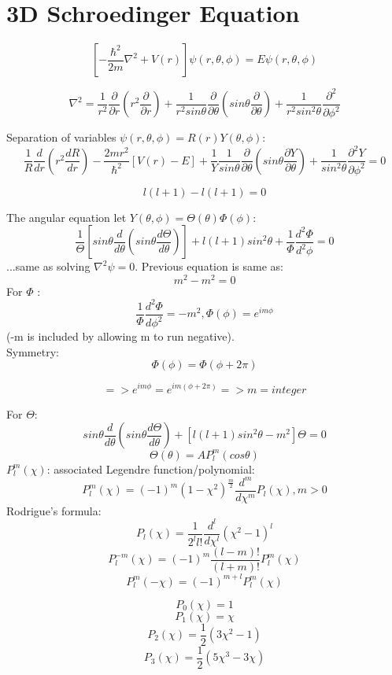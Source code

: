 \documentclass[12pt,a4paper]{article}
\begin{document}
\pagebreak

\section{3D Schroedinger Equation}

\[
[ - \frac{\hbar ^2}{2m} \nabla ^2 + V(r) ] \psi (r, \theta , \phi ) = E \psi (r, \theta , \phi )
\]

\[
\nabla ^2 = \frac{1}{r^2} \frac{\partial}{\partial r} ( r^2 \frac{\partial}{\partial r} ) + \frac{1}{r^2 sin \theta} \frac{\partial}{\partial \theta} ( sin \theta \frac{\partial}{\partial \theta}) + \frac{1}{r^2 sin ^2 \theta} \frac{\partial ^2}{\partial \phi ^2}
\]

Separation of variables $\psi (r, \theta , \phi ) = R(r) Y(\theta , \phi )$:
\[
{ \frac{1}{R} \frac{d}{dr} (r^2 \frac{dR}{dr}) - \frac{2mr^2}{\hbar ^2} [V(r)-E]} + \frac{1}{Y} { \frac{1}{sin \theta} \frac{\partial}{\partial \theta} (sin \theta \frac{\partial Y}{\partial \theta})+\frac{1}{sin ^2 \theta} \frac{\partial ^2 Y}{\partial \phi ^2} } =0
\]

\[
l(l+1) - l(l+1)=0
\]

The angular equation let $Y(\theta , \phi ) = \Theta (\theta ) \Phi (\phi )$:
\[
{ \frac{1}{\Theta} [ sin \theta \frac{d}{d \theta} (sin \theta \frac{d \Theta}{d \theta}) ] + l(l+1) sin ^2 \theta } + \frac{1}{\Phi} \frac{d^2 \Phi }{d^2 \phi} = 0
\]
...same as solving $\nabla ^2 \psi = 0$. Previous equation is same as:
\[
m^2 - m^2 =0
\]
For $\Phi$ :
\[
\frac{1}{\Phi} \frac{d^2 \Phi}{d \phi ^2}=-m^2 , \Phi (\phi ) = e^{im \phi}
\]
(-m is included by allowing m to run negative).\\
Symmetry:
\[
\Phi (\phi )= \Phi (\phi + 2 \pi )
\]

\[
=> e^{im \phi } = e^{im (\phi + 2 \pi ) } => m = integer
\]

For $\Theta$:
\[
sin \theta \frac{d}{d \theta} ( sin \theta \frac{d \Theta }{d \theta } ) + [l(l+1) sin ^2 \theta - m^2 ] \Theta =0
\]
\[
\Theta (\theta )= A P_l ^m (cos \theta )
\]
$P_l ^m (\chi )$: associated Legendre function/polynomial:
\[
P_l ^m (\chi ) = (-1)^m (1 - \chi ^2) ^{\frac{m}{2}} \frac{d^m}{d \chi ^m} P_l (\chi ), m>0
\]
Rodrigue's formula:
\[
P_l (\chi ) = \frac{1}{2^l l!} \frac{d^l}{d \chi ^l} ( \chi ^2 -1 )^l
\]
\[
P_l ^{-m} (\chi )= (-1)^m \frac{(l-m)!}{(l+m)!} P_l ^m (\chi )
\]
\[
P_l ^{m} (- \chi )= (-1)^{m+l} P_l ^m (\chi )
\]

\[
P_0 (\chi ) = 1
\]
\[
P_1 (\chi ) = \chi
\]
\[
P_2 (\chi )= \frac{1}{2} ( 3 \chi ^2 -1)
\]
\[
P_3 (\chi )= \frac{1}{2}(5 \chi ^3 - 3 \chi )
\]
\end{document}
